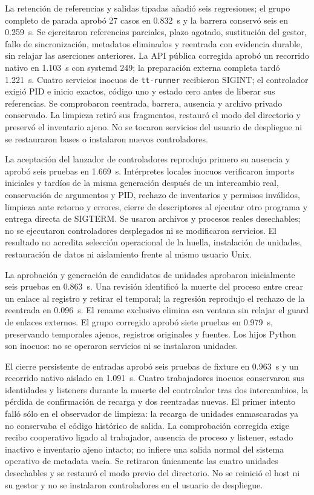 La retención de referencias y salidas tipadas añadió seis regresiones; el grupo
completo de parada aprobó 27 casos en 0.832~s y la barrera conservó seis en
0.259~s. Se ejercitaron referencias parciales, plazo agotado, sustitución del
gestor, fallo de sincronización, metadatos eliminados y reentrada con evidencia
durable, sin relajar las aserciones anteriores. La API pública corregida aprobó
un recorrido nativo en 1.103~s con systemd 249; la preparación externa completa
tardó 1.221~s. Cuatro servicios inocuos de \texttt{tt-runner} recibieron SIGINT;
el controlador exigió PID e inicio exactos, código uno y estado cero antes de
liberar sus referencias. Se comprobaron reentrada, barrera, ausencia y archivo
privado conservado. La limpieza retiró sus fragmentos, restauró el modo del
directorio y preservó el inventario ajeno. No se tocaron servicios del usuario
de despliegue ni se restauraron bases o instalaron nuevos controladores.


La aceptación del lanzador de controladores reprodujo primero su ausencia y
aprobó seis pruebas en 1.669~s. Intérpretes locales inocuos verificaron imports
iniciales y tardíos de la misma generación después de un intercambio real,
conservación de argumentos y PID, rechazo de inventarios y permisos inválidos,
limpieza ante retorno y errores, cierre de descriptores al ejecutar otro programa
y entrega directa de SIGTERM. Se usaron archivos y procesos reales desechables;
no se ejecutaron controladores desplegados ni se modificaron servicios.
El resultado no acredita selección operacional de la huella, instalación de
unidades, restauración de datos ni aislamiento frente al mismo usuario Unix.

La aprobación y generación de candidatos de unidades aprobaron inicialmente
seis pruebas en 0.863~s. Una revisión identificó la muerte del proceso entre
crear un enlace al registro y retirar el temporal; la regresión reprodujo el
rechazo de la reentrada en 0.096~s. El rename exclusivo elimina esa ventana sin
relajar el guard de enlaces externos. El grupo corregido aprobó siete pruebas
en 0.979~s, preservando temporales ajenos, registros originales y fuentes.
Los hijos Python son inocuos: no se operaron servicios ni se instalaron unidades.


El cierre persistente de entradas aprobó seis pruebas de fixture en 0.963~s y
un recorrido nativo aislado en 1.091~s. Cuatro trabajadores inocuos conservaron
sus identidades y listeners durante la muerte del controlador tras dos
intercambios, la pérdida de confirmación de recarga y dos reentradas nuevas.
El primer intento falló sólo en el observador de limpieza: la recarga de
unidades enmascaradas ya no conservaba el código histórico de salida.
La comprobación corregida exige recibo cooperativo ligado al trabajador,
ausencia de proceso y listener, estado inactivo e inventario ajeno intacto;
no infiere una salida normal del sistema operativo de metadata vacía.
Se retiraron únicamente las cuatro unidades desechables y se restauró el modo
previo del directorio. No se reinició el host ni su gestor y no se instalaron
controladores en el usuario de despliegue.

